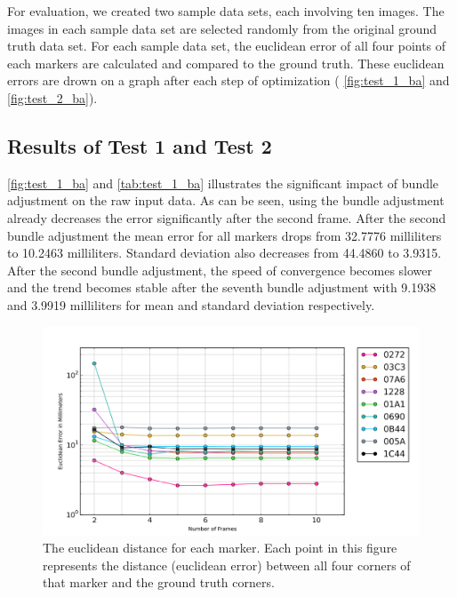 For evaluation, we created two sample data sets, each involving ten images. The images in each sample data set are selected randomly from the original ground truth data set. For each sample data set, the euclidean error of all four points of each markers are calculated and compared to the ground truth. These euclidean errors are drown on a graph after each step of optimization ( \autoref{fig:test_1_ba} and  \autoref{fig:test_2_ba}).

\subsection{Results of Test 1 and Test 2} \label{subsec:result_ba}
\autoref{fig:test_1_ba} and \autoref{tab:test_1_ba} illustrates the significant impact of bundle adjustment on the raw input data. As can be seen, using the bundle adjustment already decreases the error significantly after the second frame. After the second bundle adjustment the mean error for all markers drops from 32.7776 milliliters to 10.2463 milliliters. Standard deviation also decreases from 44.4860 to 3.9315. After the second bundle adjustment, the speed of convergence becomes slower and the trend becomes stable after the seventh bundle adjustment with 9.1938 and 3.9919 milliliters for mean and standard deviation respectively.

\begin{figure}[H]
  \centering
  \includegraphics[width=160mm]{figures/graph_test_1}
  \caption{The euclidean distance for each marker. Each point in this figure represents the distance (euclidean error) between all four corners of that marker and the ground truth corners.}\label{fig:test_1_ba}
\end{figure}

